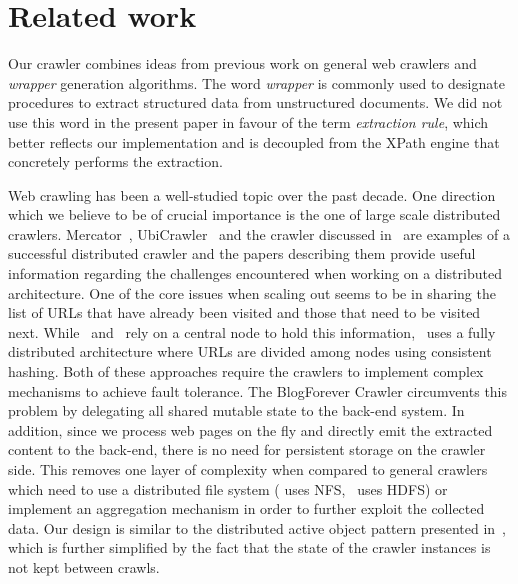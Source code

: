 \section{Related work}
\label{relatedwork}

Our crawler combines ideas from previous work on general web crawlers and \emph{wrapper} generation algorithms. The word \emph{wrapper} is commonly used to designate procedures to extract structured data from unstructured documents. We did not use this word in the present paper in favour of the term \emph{extraction rule}, which better reflects our implementation and is decoupled from the XPath engine that concretely performs the extraction.

Web crawling has been a well-studied topic over the past decade. One direction which we believe to be of crucial importance is the one of large scale distributed crawlers. Mercator~\cite{heydon99mercator}, UbiCrawler~\cite{boldi2003} and the crawler discussed in~\cite{shkapenyuk2002} are examples of a successful distributed crawler and the papers describing them provide useful information regarding the challenges encountered when working on a distributed architecture. One of the core issues when scaling out seems to be in sharing the list of URLs that have already been visited and those that need to be visited next. While~\cite{heydon99mercator} and~\cite{shkapenyuk2002} rely on a central node to hold this information,~\cite{boldi2003} uses a fully distributed architecture where URLs are divided among nodes using consistent hashing. Both of these approaches require the crawlers to implement complex mechanisms to achieve fault tolerance. The BlogForever Crawler circumvents this problem by delegating all shared mutable state to the back-end system. In addition, since we process web pages on the fly and directly emit the extracted content to the back-end, there is no need for persistent storage on the crawler side. This removes one layer of complexity when compared to general crawlers which need to use a distributed file system (\cite{shkapenyuk2002} uses NFS,~\cite{berger2011} uses HDFS) or implement an aggregation mechanism in order to further exploit the collected data. Our design is similar to the distributed active object pattern presented in~\cite{activeobject1996}, 
which is further simplified by the fact that the state of the crawler instances is not kept between crawls.

